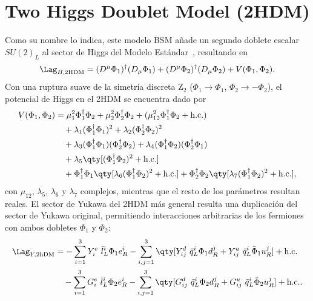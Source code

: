 \chapter{Two Higgs Doublet Model (2HDM)} \label{ap:ap1}

Como su nombre lo indica, este modelo BSM añade un segundo doblete escalar $SU(2)_L$ al sector de Higgs del Modelo Estándar~\cite{Degrande2015a,Jurciukonis2019}, resultando en
\[ \Lag_{H, \text{2HDM}} = (D^\mu \Phi_1)^\dagger (D_\mu \Phi_1) + (D^\mu \Phi_2)^\dagger (D_\mu \Phi_2) + V(\Phi_1, \Phi_2). \]
Con una ruptura suave de la simetría discreta $\mathrm{Z}_2$ ($\Phi_1 \to \Phi_1$, $\Phi_2 \to -\Phi_2$), el potencial de Higgs en el 2HDM se encuentra dado por
\begin{align*}
  V(\Phi_1, \Phi_2) &= \mu_1^2 \Phi_1^\dagger \Phi_2 + \mu_2^2 \Phi_2^\dagger \Phi_2 + (\mu_{12}^2 \Phi_1^\dagger \Phi_2 + \text{h.c.}) \\
    &\quad + \lambda_1 (\Phi_1^\dagger \Phi_1)^2 + \lambda_2 (\Phi_2^\dagger \Phi_2)^2 \\
    &\quad + \lambda_3 (\Phi_1^\dagger \Phi_1) (\Phi_2^\dagger \Phi_2) + \lambda_4 (\Phi_1^\dagger \Phi_2) (\Phi_2^\dagger \Phi_1) \\
    &\quad + \lambda_5 \qty[ (\Phi_1^\dagger \Phi_2)^2 + \text{h.c.}] \\
    &\quad + \Phi_1^\dagger \Phi_1 \qty[ \lambda_6 (\Phi_1^\dagger \Phi_2)^2 + \text{h.c.}] + \Phi_2^\dagger \Phi_2 \qty[ \lambda_7 (\Phi_1^\dagger \Phi_2)^2 + \text{h.c.}],
\end{align*}
con $\mu_{12}$, $\lambda_5$, $\lambda_6$ y $\lambda_7$ complejos, mientras que el resto de los parámetros resultan reales. El sector de Yukawa del 2HDM más general resulta una duplicación del sector de Yukawa original, permitiendo interacciones arbitrarias de los fermiones con ambos dobletes $\Phi_1$ y $\Phi_2$:
\begin{align*}
  \Lag_{Y, \text{2hDM}} &= -\sum_{i = 1}^3 Y^e_{i} \ \bar{l}_L^i \Phi_1 e_R^i -\sum_{i,j =1}^3 \qty[ Y_{ij}^d \ \bar{q}_L^i \Phi_1 d^j_R + Y_{ij}^u \ \bar{q}_L^i \tilde{\Phi}_1 u^j_R ] + \text{h.c.} \\
    &\quad -\sum_{i = 1}^3 G^e_{i} \ \bar{l}_L^i \Phi_2 e_R^i -\sum_{i,j =1}^3 \qty[ G_{ij}^d \ \bar{q}_L^i \Phi_2 d^j_R + G_{ij}^u \ \bar{q}_L^i \tilde{\Phi}_2 u^j_R ] + \text{h.c.}.
\end{align*}

